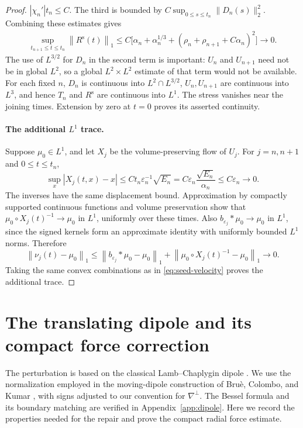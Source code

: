 \documentclass[11pt,a4paper,reqno]{amsart}
\theoremstyle{plain}
\theoremstyle{definition}
\theoremstyle{remark}
\numberwithin{equation}{section}
\newcommand{\norm}[2]{\left\|#1\right\|_{#2}}
\begin{document}
\begin{proof}
$|\chi_n'|t_n\le C$. The third is bounded by
$C\sup_{0\le s\le t_n}\|D_n(s)\|_2^2$. Combining these
estimates gives
\[
 \begin{split}
 \sup_{t_{n+1}\le t\le t_n}\norm{R^{\mathrm s}(t)}1
 \le C\bigl[\alpha_n+\alpha_n^{1/3}
       +(\rho_n+\rho_{n+1}+C\alpha_n)^2\bigr]
 \longrightarrow0.
 \end{split}
\]
The use of $L^{3/2}$ for $D_n$ in the second term is important:
$U_n$ and $U_{n+1}$ need not be in global $L^2$, so a global
$L^2\times L^2$ estimate of that term would not be available.
For each fixed $n$, $D_n$ is continuous into $L^2\cap L^{3/2}$,
$U_n,U_{n+1}$ are continuous into $L^3$, and hence $T_n$ and
$R^{\mathrm s}$ are continuous into $L^1$. The stress vanishes near
the joining times. Extension by zero at $t=0$ proves its asserted
continuity.

\paragraph{The additional $L^1$ trace.}
Suppose $\mu_0\in L^1$, and let $X_j$ be the volume-preserving flow of
$U_j$. For $j=n,n+1$ and $0\le t\le t_n$,
\[
 \sup_x|X_j(t,x)-x|
 \le Ct_n\varepsilon_n^{-1}\sqrt{E_n}
 =C\varepsilon_n\frac{\sqrt{E_n}}{\alpha_n}
 \le C\varepsilon_n\longrightarrow0.
\]
The inverses have the same displacement bound. Approximation by
compactly supported continuous functions and volume preservation show
that $\mu_0\circ X_j(t)^{-1}\to\mu_0$ in $L^1$, uniformly over these
times. Also $b_{\varepsilon_j}*\mu_0\to\mu_0$ in $L^1$, since the
signed kernels form an approximate identity with uniformly bounded
$L^1$ norms. Therefore
\[
 \norm{\nu_j(t)-\mu_0}1
 \le\norm{b_{\varepsilon_j}*\mu_0-\mu_0}1
       +\norm{\mu_0\circ X_j(t)^{-1}-\mu_0}1\longrightarrow0.
\]
Taking the same convex combinations as in \eqref{eq:seed-velocity}
proves the additional trace.
\end{proof}

\section{The translating dipole and its compact force correction}\label{sec:dipole}

The perturbation is based on the classical Lamb--Chaplygin dipole
\cite{Chaplygin,Lamb}. We use the normalization employed in the
moving-dipole construction of Bru\`e, Colombo, and Kumar
\cite[\S2.2]{BCK}, with signs adjusted to our convention for
$\nabla^\perp$. The Bessel formula and its boundary matching are verified in
Appendix~\ref{app:dipole}. Here we record the properties needed for
the repair and prove the compact radial force estimate.
\end{document}
